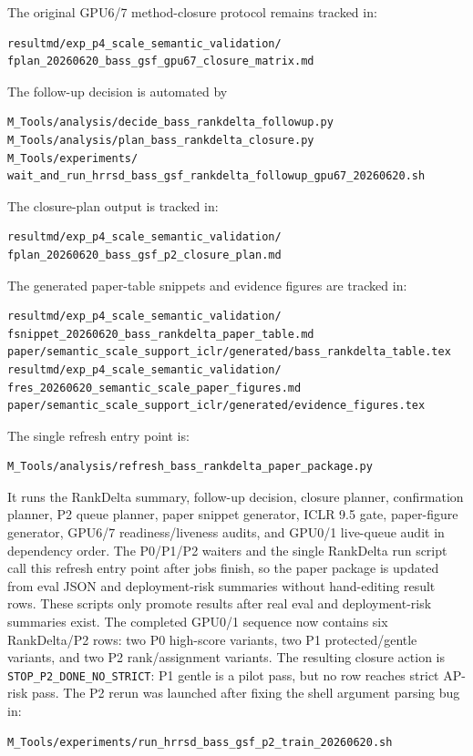 \documentclass[10pt]{article}
\begin{document}
The original GPU6/7 method-closure protocol remains tracked in:
\begin{verbatim}
resultmd/exp_p4_scale_semantic_validation/
fplan_20260620_bass_gsf_gpu67_closure_matrix.md
\end{verbatim}
The follow-up decision is automated by
\begin{verbatim}
M_Tools/analysis/decide_bass_rankdelta_followup.py
M_Tools/analysis/plan_bass_rankdelta_closure.py
M_Tools/experiments/
wait_and_run_hrrsd_bass_gsf_rankdelta_followup_gpu67_20260620.sh
\end{verbatim}
The closure-plan output is tracked in:
\begin{verbatim}
resultmd/exp_p4_scale_semantic_validation/
fplan_20260620_bass_gsf_p2_closure_plan.md
\end{verbatim}
The generated paper-table snippets and evidence figures are tracked in:
\begin{verbatim}
resultmd/exp_p4_scale_semantic_validation/
fsnippet_20260620_bass_rankdelta_paper_table.md
paper/semantic_scale_support_iclr/generated/bass_rankdelta_table.tex
resultmd/exp_p4_scale_semantic_validation/
fres_20260620_semantic_scale_paper_figures.md
paper/semantic_scale_support_iclr/generated/evidence_figures.tex
\end{verbatim}
The single refresh entry point is:
\begin{verbatim}
M_Tools/analysis/refresh_bass_rankdelta_paper_package.py
\end{verbatim}
It runs the RankDelta summary, follow-up decision, closure planner,
confirmation planner, P2 queue planner, paper snippet generator, ICLR 9.5
gate, paper-figure generator, GPU6/7 readiness/liveness audits, and GPU0/1
live-queue audit in dependency order.  The P0/P1/P2 waiters and the single
RankDelta run script call this refresh entry point after jobs finish, so the
paper package is updated from eval JSON and deployment-risk summaries without
hand-editing result rows.
These scripts only promote results after real eval and deployment-risk
summaries exist.  The completed GPU0/1 sequence now contains six RankDelta/P2
rows: two P0 high-score variants, two P1 protected/gentle variants, and two P2
rank/assignment variants.  The resulting closure action is
\texttt{STOP\_P2\_DONE\_NO\_STRICT}: P1 gentle is a pilot pass, but no row
reaches strict AP-risk pass.  The P2 rerun was launched after fixing the shell
argument parsing bug in:
\begin{verbatim}
M_Tools/experiments/run_hrrsd_bass_gsf_p2_train_20260620.sh
\end{verbatim}
\end{document}
